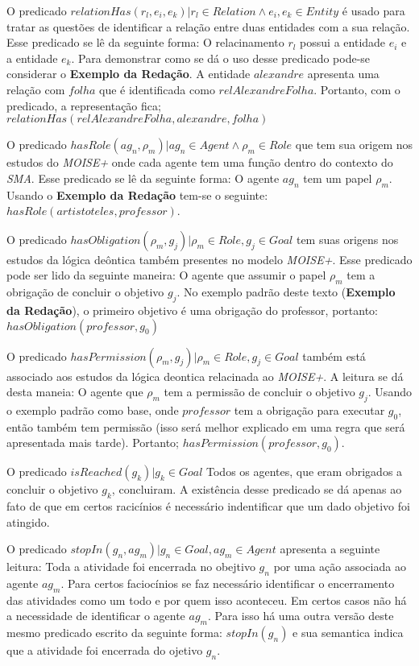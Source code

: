 O predicado $relationHas(r_l,e_i,e_k) | r_l \in Relation \wedge  e_i, e_k \in Entity$ é usado para tratar as questões de identificar a relação entre 
duas entidades com a sua relação. Esse predicado se lê da seguinte forma: O relacinamento $r_l$ possui a entidade $e_i$ e a entidade
$e_k$. Para demonstrar como se dá o uso desse predicado pode-se considerar o \textbf{Exemplo da Redação}. A entidade $alexandre$ apresenta 
uma relação com $folha$ que é identificada como $relAlexandreFolha$. Portanto, com o predicado, a representação 
fica; $relationHas(relAlexandreFolha,alexandre,folha)$

O predicado $hasRole(ag_n,\rho_m) | ag_n \in Agent \wedge \rho_m \in Role$ que tem sua origem nos estudos do \textit{MOISE+} onde 
cada agente tem uma função dentro do contexto do \textit{SMA}. Esse predicado se lê da seguinte forma: O agente $ag_n$ tem um
papel $\rho_m$. Usando o \textbf{Exemplo da Redação} tem-se o seguinte: $hasRole(artistoteles,professor)$. 

O predicado $hasObligation(\rho_m,g_j) | \rho_m \in Role, g_j \in Goal $ tem suas origens nos estudos da lógica deôntica também 
presentes no modelo \textit{MOISE+}. Esse predicado pode ser lido da seguinte maneira: O agente que assumir o papel $\rho_m$ tem a 
obrigação de concluir o objetivo $g_j$. No exemplo padrão deste texto (\textbf{Exemplo da Redação}), o primeiro objetivo é uma
obrigação do professor, portanto: $hasObligation(professor,g_0)$

O predicado $hasPermission(\rho_m, g_j) | \rho_m \in Role, g_j \in Goal $ também está associado aos estudos da lógica deontica
relacinada ao \textit{MOISE+}. A leitura se dá desta maneia: O agente que $\rho_m$ tem a permissão de concluir o objetivo $g_j$.
Usando o exemplo padrão como base, onde $professor$ tem a obrigação para executar $g_0$, então também tem permissão (isso
será melhor explicado em uma regra que será apresentada mais tarde). Portanto; $hasPermission(professor,g_0)$.  

O predicado $isReached(g_k) | g_k \in Goal $ Todos os agentes, que eram obrigados a concluir o objetivo $g_k$, concluiram. A 
existência desse predicado se dá apenas ao fato de que em certos racicínios é necessário indentificar que um dado objetivo 
foi atingido. 

O predicado $stopIn(g_n, ag_m) | g_n \in Goal, ag_m \in Agent$ apresenta a seguinte leitura: Toda a atividade foi encerrada no
obejtivo $g_n$ por uma ação associada ao agente $ag_m$. Para certos faciocínios se faz necessário identificar o encerramento
das atividades como um todo e por quem isso aconteceu. Em certos casos não há a necessidade de identificar o agente $ag_m$. Para
isso há uma outra versão deste mesmo predicado escrito da seguinte forma: $stopIn(g_n)$ e sua semantica indica que a atividade 
foi encerrada do ojetivo $g_n$.

